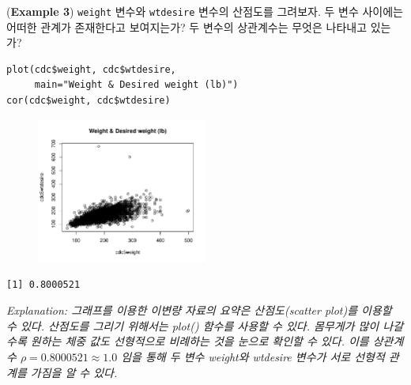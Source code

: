 \documentclass{article}
\begin{document}
(\textbf{Example 3}) \texttt{weight} 변수와 \texttt{wtdesire} 변수의 산점도를 그려보자. 두 변수 사이에는 어떠한 관계가 
존재한다고 보여지는가? 두 변수의 상관계수는 무엇은 나타내고 있는가?
\begin{lstlisting}[style={r-style}]
plot(cdc$weight, cdc$wtdesire, 
     main="Weight & Desired weight (lb)")
cor(cdc$weight, cdc$wtdesire)
\end{lstlisting}
\begin{figure}[htb!]
    \centering
    \includegraphics[width=0.5\textwidth]{fig/ex3.pdf}
    \label{fig:ex3}
\end{figure}
\begin{lstlisting}[style={out-style}]
[1] 0.8000521
\end{lstlisting}
\emph{Explanation: 그래프를 이용한 이변량 자료의 요약은 산점도(scatter plot)를 이용할 수 있다. 산점도를 그리기 위해서는 plot() 함수를 사용할 수 있다. 몸무게가 많이 나갈 수록 원하는 체중 값도 선형적으로 비례하는 것을 눈으로 확인할 수 있다. 이를 상관계수 $\rho = 0.8000521 \approx 1.0$ 임을 통해 두 변수 weight와 wtdesire 변수가 서로 선형적 관계를 가짐을 알 수 있다.} \\
\end{document}
